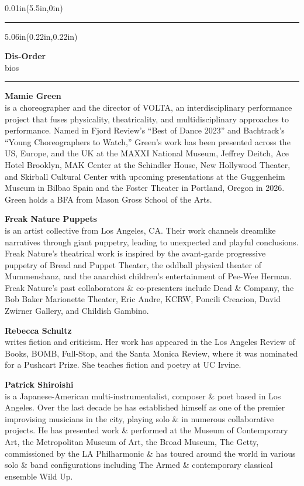 \documentclass[10pt,letterpaper,landscape]{article}
\newenvironment{acpanel}[2]{%
  \begin{textblock*}{5.06in}(#1,#2)%
    \begin{minipage}[t][8.06in][t]{5.06in}%
      \raggedright%
}{%
    \end{minipage}%
  \end{textblock*}%
}
\newcommand{\foldline}{%
  \begin{textblock*}{0.01in}(5.5in,0in)
    {\color{black!35}\rule{0.6pt}{8.5in}}
  \end{textblock*}
}
\newcommand{\biochip}[2]{%
\begingroup
\setlength{\fboxsep}{1.5pt}%
\noindent\colorbox{black!4}{%
\parbox{\dimexpr\linewidth-2\fboxsep\relax}{%
{\fontsize{6.2}{6.8}\selectfont\textbf{#1}}\\[-0.14em]
{\fontsize{5.1}{5.75}\selectfont #2}
}}\vspace{0.038in}
\endgroup
}
\newcommand{\biorow}[2]{\biochip{#1}{#2}}
\begin{document}
\null

\foldline

\begin{acpanel}{0.22in}{0.22in}
\begin{center}
{\fontsize{16}{17}\selectfont\textbf{Dis-Order}}\\[-0.18em]
{\fontsize{8.7}{9.6}\selectfont bios}
\end{center}
\vspace{0.08in}
\hrule
\vspace{0.05in}

\biorow{Mamie Green}{is a choreographer and the director of VOLTA, an interdisciplinary performance project that fuses physicality, theatricality, and multidisciplinary approaches to performance. Named in Fjord Review's ``Best of Dance 2023'' and Bachtrack's ``Young Choreographers to Watch,'' Green's work has been presented across the US, Europe, and the UK at the MAXXI National Museum, Jeffrey Deitch, Ace Hotel Brooklyn, MAK Center at the Schindler House, New Hollywood Theater, and Skirball Cultural Center with upcoming presentations at the Guggenheim Museum in Bilbao Spain and the Foster Theater in Portland, Oregon in 2026. Green holds a BFA from Mason Gross School of the Arts.}
\biorow{Freak Nature Puppets}{is an artist collective from Los Angeles, CA. Their work channels dreamlike narratives through giant puppetry, leading to unexpected and playful conclusions. Freak Nature's theatrical work is inspired by the avant-garde progressive puppetry of Bread and Puppet Theater, the oddball physical theater of Mummenshanz, and the anarchist children's entertainment of Pee-Wee Herman. Freak Nature's past collaborators \& co-presenters include Dead \& Company, the Bob Baker Marionette Theater, Eric Andre, KCRW, Poncili Creacion, David Zwirner Gallery, and Childish Gambino.}
\biorow{Rebecca Schultz}{writes fiction and criticism. Her work has appeared in the Los Angeles Review of Books, BOMB, Full-Stop, and the Santa Monica Review, where it was nominated for a Pushcart Prize. She teaches fiction and poetry at UC Irvine.}
\biorow{Patrick Shiroishi}{is a Japanese-American multi-instrumentalist, composer \& poet based in Los Angeles. Over the last decade he has established himself as one of the premier improvising musicians in the city, playing solo \& in numerous collaborative projects. He has presented work \& performed at the Museum of Contemporary Art, the Metropolitan Museum of Art, the Broad Museum, The Getty, commissioned by the LA Philharmonic \& has toured around the world in various solo \& band configurations including The Armed \& contemporary classical ensemble Wild Up.}

\end{acpanel}
\end{document}

